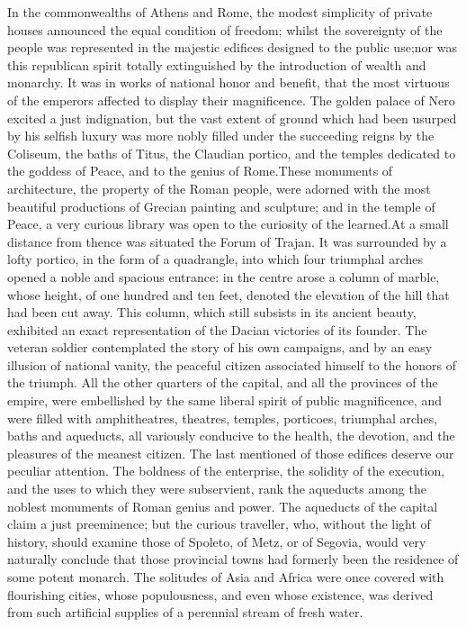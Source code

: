 
In the commonwealths of Athens and Rome, the modest simplicity of
private houses announced the equal condition of freedom; whilst
the sovereignty of the people was represented in the majestic
edifices designed to the public use;\footnotemark[71] nor was this republican
spirit totally extinguished by the introduction of wealth and
monarchy. It was in works of national honor and benefit, that the
most virtuous of the emperors affected to display their
magnificence. The golden palace of Nero excited a just
indignation, but the vast extent of ground which had been usurped
by his selfish luxury was more nobly filled under the succeeding
reigns by the Coliseum, the baths of Titus, the Claudian portico,
and the temples dedicated to the goddess of Peace, and to the
genius of Rome.\footnotemark[72] These monuments of architecture, the property
of the Roman people, were adorned with the most beautiful
productions of Grecian painting and sculpture; and in the temple
of Peace, a very curious library was open to the curiosity of the
learned.\footnotemark[721] At a small distance from thence was situated the
Forum of Trajan. It was surrounded by a lofty portico, in the
form of a quadrangle, into which four triumphal arches opened a
noble and spacious entrance: in the centre arose a column of
marble, whose height, of one hundred and ten feet, denoted the
elevation of the hill that had been cut away. This column, which
still subsists in its ancient beauty, exhibited an exact
representation of the Dacian victories of its founder. The
veteran soldier contemplated the story of his own campaigns, and
by an easy illusion of national vanity, the peaceful citizen
associated himself to the honors of the triumph. All the other
quarters of the capital, and all the provinces of the empire,
were embellished by the same liberal spirit of public
magnificence, and were filled with amphitheatres, theatres,
temples, porticoes, triumphal arches, baths and aqueducts, all
variously conducive to the health, the devotion, and the
pleasures of the meanest citizen. The last mentioned of those
edifices deserve our peculiar attention. The boldness of the
enterprise, the solidity of the execution, and the uses to which
they were subservient, rank the aqueducts among the noblest
monuments of Roman genius and power. The aqueducts of the capital
claim a just preeminence; but the curious traveller, who, without
the light of history, should examine those of Spoleto, of Metz,
or of Segovia, would very naturally conclude that those
provincial towns had formerly been the residence of some potent
monarch. The solitudes of Asia and Africa were once covered with
flourishing cities, whose populousness, and even whose existence,
was derived from such artificial supplies of a perennial stream
of fresh water.\footnotemark[73]

